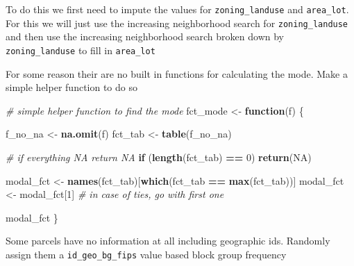 \documentclass[]{book}
\newenvironment{Shaded}{\begin{snugshade}}{\end{snugshade}}
\newcommand{\KeywordTok}[1]{\textcolor[rgb]{0.13,0.29,0.53}{\textbf{#1}}}
\newcommand{\DecValTok}[1]{\textcolor[rgb]{0.00,0.00,0.81}{#1}}
\newcommand{\StringTok}[1]{\textcolor[rgb]{0.31,0.60,0.02}{#1}}
\newcommand{\CommentTok}[1]{\textcolor[rgb]{0.56,0.35,0.01}{\textit{#1}}}
\newcommand{\OtherTok}[1]{\textcolor[rgb]{0.56,0.35,0.01}{#1}}
\newcommand{\ControlFlowTok}[1]{\textcolor[rgb]{0.13,0.29,0.53}{\textbf{#1}}}
\newcommand{\OperatorTok}[1]{\textcolor[rgb]{0.81,0.36,0.00}{\textbf{#1}}}
\newcommand{\NormalTok}[1]{#1}
\theoremstyle{definition}
\theoremstyle{definition}
\theoremstyle{definition}
\theoremstyle{remark}
\begin{document}
To do this we first need to impute the values for
\texttt{zoning\_landuse} and \texttt{area\_lot}. For this we will just
use the increasing neighborhood search for \texttt{zoning\_landuse} and
then use the increasing neighborhood search broken down by
\texttt{zoning\_landuse} to fill in \texttt{area\_lot}

For some reason their are no built in functions for calculating the
mode. Make a simple helper function to do so

\begin{Shaded}
\begin{Highlighting}[]
\CommentTok{# simple helper function to find the mode}
\NormalTok{fct_mode <-}\StringTok{ }\ControlFlowTok{function}\NormalTok{(f) \{}
  
\NormalTok{  f_no_na <-}\StringTok{ }\KeywordTok{na.omit}\NormalTok{(f)}
\NormalTok{  fct_tab <-}\StringTok{ }\KeywordTok{table}\NormalTok{(f_no_na)}
  
  \CommentTok{# if everything NA return NA}
  \ControlFlowTok{if}\NormalTok{ (}\KeywordTok{length}\NormalTok{(fct_tab) }\OperatorTok{==}\StringTok{ }\DecValTok{0}\NormalTok{) }\KeywordTok{return}\NormalTok{(}\OtherTok{NA}\NormalTok{)}
  
\NormalTok{  modal_fct <-}\StringTok{ }\KeywordTok{names}\NormalTok{(fct_tab)[}\KeywordTok{which}\NormalTok{(fct_tab }\OperatorTok{==}\StringTok{ }\KeywordTok{max}\NormalTok{(fct_tab))]}
\NormalTok{  modal_fct <-}\StringTok{ }\NormalTok{modal_fct[}\DecValTok{1}\NormalTok{] }\CommentTok{# in case of ties, go with first one}
  
\NormalTok{  modal_fct}
\NormalTok{\}}
\end{Highlighting}
\end{Shaded}

Some parcels have no information at all including geographic ids.
Randomly assign them a \texttt{id\_geo\_bg\_fips} value based block
group frequency
\end{document}
